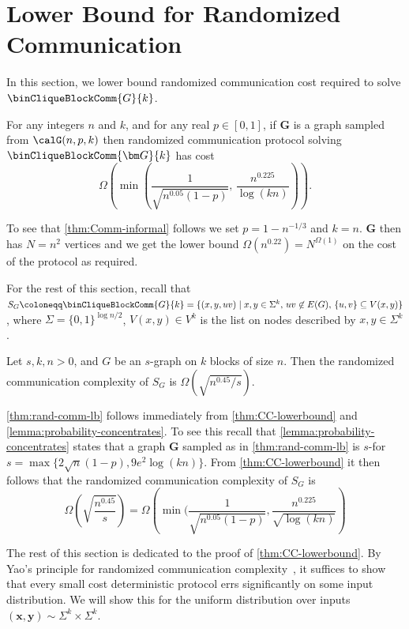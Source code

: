 \section{Lower Bound for Randomized Communication} \label{sec:binCliqueRandComm}
In this section, we lower bound randomized communication cost required to solve $\binCliqueBlockComm{G}{k}$.
\begin{theorem}
\label{thm:rand-comm-lb}
    For any
    integers $n$ and $k$, and for any real $p \in [0,1]$, 
    if $\bm G$ is a graph sampled from $\calG(n,p,k)$ then \aas randomized communication protocol solving $\binCliqueBlockComm{\bm G}{k}$ has cost 
    \begin{equation*}
        \Omega\left({\min\left(
    \frac{1}{\sqrt{n^{0.05}(1-p)}},
    \,
    \frac{n^{0.225}}{\log(kn)}\right)}\right).
    \end{equation*}
\end{theorem}

   To see that \autoref{thm:Comm-informal} follows we set $p = 1-n^{-1/3}$ and $k=n$. $\bm G$ then has $N=n^2$ vertices and we get the lower bound $\Omega(n^{0.22})=N^{\Omega(1)}$ on the cost of the protocol as required.

For the rest of this section, recall that $S_{G} \coloneqq \binCliqueBlockComm{G}{k} = \{(x, y, uv) \mid x, y \in \Sigma^k,\, uv \not\in E( G),\, \{u,v\} \subseteq V(x,y)\}$, where $\Sigma = \{0,1\}^{\log n / 2}$, $V(x,y) \in V^k$ is the list on nodes described by $x,y\in \Sigma^k$.
\begin{theorem}
\label{thm:CC-lowerbound}
    Let $s,k,n>0$, and $G$ be an $s$-\ndense graph on $k$ blocks of size $n$.
    Then the randomized communication complexity of $S_G$ is $\Omega(\sqrt{n^{0.45}/s})$.
\end{theorem}
\autoref{thm:rand-comm-lb} follows immediately from \autoref{thm:CC-lowerbound} and \autoref{lemma:probability-concentrates}. To see this recall that \autoref{lemma:probability-concentrates} states that \aas a graph $\bm G$ sampled as in \autoref{thm:rand-comm-lb} is $s$-\ndense for $s={\max\{2\sqrt{n}(1-p),9e^2\log(kn)\}}$. From \autoref{thm:CC-lowerbound} it then follows that the randomized communication complexity of $S_G$ is
\[\Omega\left(\sqrt{\frac{n^{0.45}}{s}}\right)=\Omega\left(\min(\frac{1}{\sqrt{n^{0.05}(1-p)}},\frac{n^{0.225}}{\sqrt{\log(kn)}}\right)\]




The rest of this section is dedicated to the proof of \autoref{thm:CC-lowerbound}. By Yao's principle for randomized communication complexity~\cite{yao83}, it suffices to show that every small cost deterministic protocol errs significantly on some input distribution. We will show this for the uniform distribution over inputs $(\bm x, \bm y) \sim \Sigma^k \times \Sigma^k$.

